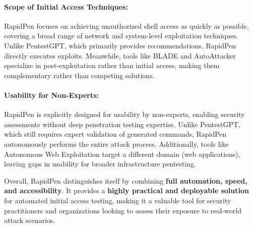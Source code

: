 \paragraph{Scope of Initial Access Techniques:} RapidPen focuses on achieving unauthorized shell access as quickly as possible, covering a broad range of network and system-level exploitation techniques. Unlike PentestGPT, which primarily provides recommendations, RapidPen directly executes exploits. Meanwhile, tools like BLADE and AutoAttacker specialize in post-exploitation rather than initial access, making them complementary rather than competing solutions.

\paragraph{Usability for Non-Experts:} RapidPen is explicitly designed for usability by non-experts, enabling security assessments without deep penetration testing expertise. Unlike PentestGPT, which still requires expert validation of generated commands, RapidPen autonomously performs the entire attack process. Additionally, tools like Autonomous Web Exploitation target a different domain (web applications), leaving gaps in usability for broader infrastructure pentesting.

Overall, RapidPen distinguishes itself by combining \textbf{full automation, speed, and accessibility}. It provides a \textbf{highly practical and deployable solution} for automated initial access testing, making it a valuable tool for security practitioners and organizations looking to assess their exposure to real-world attack scenarios.